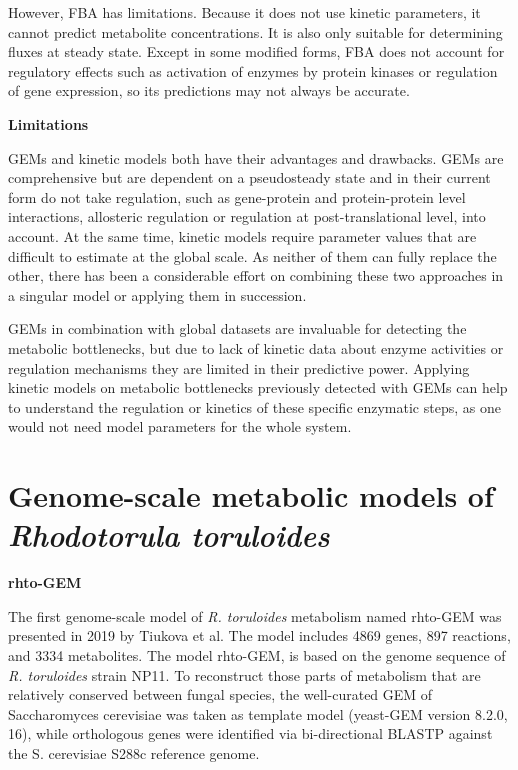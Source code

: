 However, FBA has limitations. Because it does not use kinetic parameters, it cannot 
predict metabolite concentrations. It is also only suitable for determining fluxes 
at steady state. Except in some modified forms, FBA does not account for regulatory effects 
such as activation of enzymes by protein kinases or regulation of gene expression, so its predictions 
may not always be accurate. \cite{Orth2010}

\textbf{Limitations}

GEMs and kinetic models both have their advantages
and drawbacks. GEMs are comprehensive but are dependent on a pseudosteady state and in their current form
do not take regulation, such as gene-protein and protein-protein level interactions, allosteric regulation or 
regulation at post-translational level, into account. At the same time, kinetic models require parameter values that are
difficult to estimate at the global scale. As neither of them can fully replace the other, there has been a considerable
effort on combining these two approaches in a singular model or applying them in succession. \cite{Kerkhoven2014}

GEMs in combination with global datasets are invaluable for detecting
the metabolic bottlenecks, but due to lack of kinetic data about enzyme activities or regulation mechanisms they
are limited in their predictive power. Applying kinetic models on metabolic bottlenecks previously detected with
GEMs can help to understand the regulation or kinetics of these specific enzymatic steps, as one would not need
model parameters for the whole system. \cite{Kerkhoven2014}


\section{Genome-scale metabolic models of \textit{Rhodotorula toruloides}} 

\textbf{rhto-GEM}

The first genome-scale model of \textit{R. toruloides} metabolism named rhto-GEM was presented in 2019 by Tiukova et al. The model includes 4869 genes, 
897 reactions, and 3334 metabolites. The model rhto-GEM, is based on the genome sequence of \textit{R. toruloides} strain 
NP11. To reconstruct those parts of metabolism that are relatively conserved between fungal species, the 
well-curated GEM of Saccharomyces cerevisiae was taken as template model (yeast-GEM version 
8.2.0, 16), while orthologous genes were identified via bi-directional BLASTP against the S. cerevisiae 
S288c reference genome. \cite{Tiukova2019}

